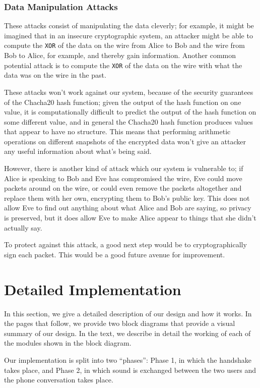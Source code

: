 \documentclass[a4paper]{report}
\begin{document}
\subsection{Data Manipulation Attacks}

These attacks consist of manipulating the data cleverly; for example, it might be imagined that in an insecure cryptographic system, an attacker might be able to compute the \verb|XOR| of the data on the wire from Alice to Bob and the wire from Bob to Alice, for example, and thereby gain information. Another common potential attack is to compute the \verb|XOR| of the data on the wire with what the data was on the wire in the past. 

These attacks won't work against our system, because of the security guarantees of the Chacha20 hash function; given the output of the hash function on one value, it is computationally difficult to predict the output of the hash function on some different value, and in general the Chacha20 hash function produces values that appear to have no structure. This means that performing arithmetic operations on different snapshots of the encrypted data won't give an attacker any useful information about what's being said.

However, there is another kind of attack which our system is vulnerable to; if Alice is speaking to Bob and Eve has compromised the wire, Eve could move packets around on the wire, or could even remove the packets altogether and replace them with her own, encrypting them to Bob's public key. This does not allow Eve to find out anything about what Alice and Bob are saying, so privacy is preserved, but it does allow Eve to make Alice appear to things that she didn't actually say.

To protect against this attack, a good next step would be to cryptographically sign each packet. This would be a good future avenue for improvement.

\chapter{Detailed Implementation}

In this section, we give a detailed description of our design and how it works. In the pages that follow, we provide two block diagrams that provide a visual summary of our design. In the text, we describe in detail the working of each of the modules shown in the block diagram.

Our implementation is split into two ``phases'': Phase 1, in which the handshake takes place, and Phase 2, in which sound is exchanged between the two users and the phone conversation takes place.
\end{document}
